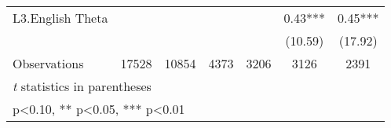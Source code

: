 \begin{sidewaystable}[htbp]
\begin{tabular}{l*{6}{c}}
L3.English Theta&            &            &            &            &     0.43***&     0.45***\\
                &            &            &            &            &  (10.59)   &  (17.92)   \\
\midrule
Observations    &    17528   &    10854   &     4373   &     3206   &     3126   &     2391   \\
\bottomrule
\multicolumn{7}{l}{\footnotesize \textit{t} statistics in parentheses}\\
\multicolumn{7}{l}{\footnotesize * p<0.10, ** p<0.05, *** p<0.01}\\
\end{tabular}
\end{sidewaystable}
